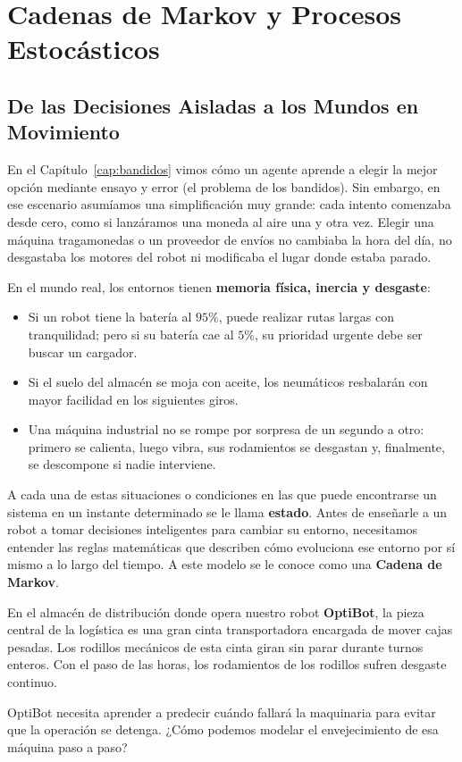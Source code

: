 \chapter{Cadenas de Markov y Procesos Estocásticos}
\label{cap:markov}

\section{De las Decisiones Aisladas a los Mundos en Movimiento}
En el Capítulo~\ref{cap:bandidos} vimos cómo un agente aprende a elegir la mejor opción mediante ensayo y error (el problema de los bandidos). Sin embargo, en ese escenario asumíamos una simplificación muy grande: cada intento comenzaba desde cero, como si lanzáramos una moneda al aire una y otra vez. Elegir una máquina tragamonedas o un proveedor de envíos no cambiaba la hora del día, no desgastaba los motores del robot ni modificaba el lugar donde estaba parado.

En el mundo real, los entornos tienen \textbf{memoria física, inercia y desgaste}:
\begin{itemize}
  \item Si un robot tiene la batería al $95\%$, puede realizar rutas largas con tranquilidad; pero si su batería cae al $5\%$, su prioridad urgente debe ser buscar un cargador.
  \item Si el suelo del almacén se moja con aceite, los neumáticos resbalarán con mayor facilidad en los siguientes giros.
  \item Una máquina industrial no se rompe por sorpresa de un segundo a otro: primero se calienta, luego vibra, sus rodamientos se desgastan y, finalmente, se descompone si nadie interviene.
\end{itemize}

A cada una de estas situaciones o condiciones en las que puede encontrarse un sistema en un instante determinado se le llama \textbf{estado}. Antes de enseñarle a un robot a tomar decisiones inteligentes para cambiar su entorno, necesitamos entender las reglas matemáticas que describen cómo evoluciona ese entorno por sí mismo a lo largo del tiempo. A este modelo se le conoce como una \textbf{Cadena de Markov}.

\begin{optibot}
En el almacén de distribución donde opera nuestro robot \textbf{OptiBot}, la pieza central de la logística es una gran cinta transportadora encargada de mover cajas pesadas. Los rodillos mecánicos de esta cinta giran sin parar durante turnos enteros. Con el paso de las horas, los rodamientos de los rodillos sufren desgaste continuo. 

OptiBot necesita aprender a predecir cuándo fallará la maquinaria para evitar que la operación se detenga. ¿Cómo podemos modelar el envejecimiento de esa máquina paso a paso?
\end{optibot}

